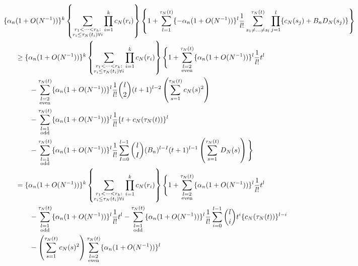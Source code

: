 \documentclass{article}
\newcommand{\1}[1]{\mathbbm{1}_{#1}}
\begin{document}
\begin{align}
\{ \alpha_n &(1 + O(N^{-1}) ) \}^k
\left\{ \sum_{\substack{r_1 <\dots< r_k :\\ r_i \leq \tau_N(t_i) \forall i}} \prod_{i=1}^k c_N(r_i) \right\}
\left\{ 1 + \sum_{l=1}^{\tau_N(t)} \{ - \alpha_n (1 + O(N^{-1}) ) \}^l \frac{1}{l!}
\sum_{s_1 \neq \dots \neq s_l}^{\tau_N(t)} \prod_{j=1}^l
\{ c_N(s_j) + B_n D_N(s_j) \} \right\} \notag\\
&\geq \{ \alpha_n (1 + O(N^{-1}) ) \}^k
\left\{ \sum_{\substack{r_1 <\dots< r_k :\\ r_i \leq \tau_N(t_i) \forall i}} \prod_{i=1}^k c_N(r_i) \right\}
\Bigg\{ 1 + \sum_{\substack{ l=2 \\ \text{even} }}^{\tau_N(t)} 
\{ \alpha_n (1 + O(N^{-1}) ) \}^l \frac{1}{l!} t^l \notag\\
&\qquad- \sum_{\substack{ l=2 \\ \text{even} }}^{\tau_N(t)}
\{ \alpha_n (1 + O(N^{-1}) ) \}^l \frac{1}{l!} \binom{l}{2} (t+1)^{l-2}
\left( \sum_{s=1}^{\tau_N(t)} c_N(s)^2 \right) \notag\\
&\qquad- \sum_{\substack{ l=1 \\ \text{odd} }}^{\tau_N(t)}
\{ \alpha_n (1 + O(N^{-1}) ) \}^l \frac{1}{l!}
\{ t + c_N(\tau_N(t)) \}^l \notag\\
&\qquad- \sum_{\substack{ l=1 \\ \text{odd} }}^{\tau_N(t)}
\{ \alpha_n (1 + O(N^{-1}) ) \}^l \frac{1}{l!}
\sum_{I=0}^{l-1} \binom{l}{I} (B_n)^{l-I} (t+1)^{l-1}
\left( \sum_{s=1}^{\tau_N(t)} D_N(s) \right) \Bigg\} \notag\\
&= \{ \alpha_n (1 + O(N^{-1}) ) \}^k
\left\{ \sum_{\substack{r_1 <\dots< r_k :\\ r_i \leq \tau_N(t_i) \forall i}} \prod_{i=1}^k c_N(r_i) \right\}
\Bigg\{ 1 
+ \sum_{\substack{ l=2 \\ \text{even} }}^{\tau_N(t)} \{ \alpha_n (1 + O(N^{-1}) ) \}^l \frac{1}{l!} t^l \notag\\
&\qquad- \sum_{\substack{ l=1 \\ \text{odd} }}^{\tau_N(t)} \{ \alpha_n (1 + O(N^{-1}) ) \}^l \frac{1}{l!} t^l 
- \sum_{\substack{ l=1 \\ \text{odd} }}^{\tau_N(t)} \{ \alpha_n (1 + O(N^{-1}) ) \}^l \frac{1}{l!}
\sum_{i=0}^{l-1} \binom{l}{i} t^i \{ c_N(\tau_N(t)) \}^{l-i} \notag\\
&\qquad- \left( \sum_{s=1}^{\tau_N(t)} c_N(s)^2 \right)
\sum_{\substack{ l=2 \\ \text{even} }}^{\tau_N(t)} \{ \alpha_n (1 + O(N^{-1}) ) \}^l 

\end{align}
\end{document}
